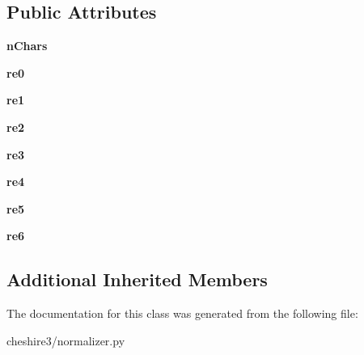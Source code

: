 \subsection*{Public Attributes}
\begin{DoxyCompactItemize}
\item 
\hypertarget{classcheshire3_1_1normalizer_1_1_phonetic_normalizer_a8bde065977ac3752aad626419b04c938}{{\bfseries n\-Chars}}\label{classcheshire3_1_1normalizer_1_1_phonetic_normalizer_a8bde065977ac3752aad626419b04c938}

\item 
\hypertarget{classcheshire3_1_1normalizer_1_1_phonetic_normalizer_a90ebe00754ad21047e8d6101d50692d1}{{\bfseries re0}}\label{classcheshire3_1_1normalizer_1_1_phonetic_normalizer_a90ebe00754ad21047e8d6101d50692d1}

\item 
\hypertarget{classcheshire3_1_1normalizer_1_1_phonetic_normalizer_afeaa06eb66fe325a59946aef85492c63}{{\bfseries re1}}\label{classcheshire3_1_1normalizer_1_1_phonetic_normalizer_afeaa06eb66fe325a59946aef85492c63}

\item 
\hypertarget{classcheshire3_1_1normalizer_1_1_phonetic_normalizer_af65b9b3241d305a348d8050e904402a8}{{\bfseries re2}}\label{classcheshire3_1_1normalizer_1_1_phonetic_normalizer_af65b9b3241d305a348d8050e904402a8}

\item 
\hypertarget{classcheshire3_1_1normalizer_1_1_phonetic_normalizer_a097c175b24cb15dace474360c555c5cc}{{\bfseries re3}}\label{classcheshire3_1_1normalizer_1_1_phonetic_normalizer_a097c175b24cb15dace474360c555c5cc}

\item 
\hypertarget{classcheshire3_1_1normalizer_1_1_phonetic_normalizer_a45f4ce6de51951558e3681a577d70d74}{{\bfseries re4}}\label{classcheshire3_1_1normalizer_1_1_phonetic_normalizer_a45f4ce6de51951558e3681a577d70d74}

\item 
\hypertarget{classcheshire3_1_1normalizer_1_1_phonetic_normalizer_a0ed5562f1242940365b27700bbeee211}{{\bfseries re5}}\label{classcheshire3_1_1normalizer_1_1_phonetic_normalizer_a0ed5562f1242940365b27700bbeee211}

\item 
\hypertarget{classcheshire3_1_1normalizer_1_1_phonetic_normalizer_a6dbabcbeca10bc3c23e82e7ed90f07e6}{{\bfseries re6}}\label{classcheshire3_1_1normalizer_1_1_phonetic_normalizer_a6dbabcbeca10bc3c23e82e7ed90f07e6}

\end{DoxyCompactItemize}
\subsection*{Additional Inherited Members}


The documentation for this class was generated from the following file\-:\begin{DoxyCompactItemize}
\item 
cheshire3/normalizer.\-py\end{DoxyCompactItemize}
